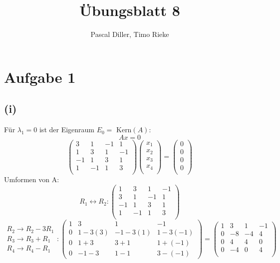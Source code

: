 \documentclass{article}
\title{Übungsblatt 8}
\author{Pascal Diller, Timo Rieke}
\begin{document}
\maketitle

\section*{Aufgabe 1}
\subsection*{(i)}
Für $\lambda_1 = 0$ ist der Eigenraum $E_0 =$ Kern$(A)$:
\[Ax = 0\]
\[\begin{pmatrix}
    3 & 1 & -1 & 1 \\
    1 & 3 & 1 & -1 \\
    -1 & 1 & 3 & 1 \\
    1 & -1 & 1 & 3 \\
\end{pmatrix} \begin{pmatrix}
    x_1 \\
    x_2 \\
    x_3 \\
    x_4 \\
\end{pmatrix} = \begin{pmatrix}
    0 \\
    0 \\
    0 \\
    0 \\
\end{pmatrix}\]
Umformen von A:
\[R_1 \leftrightarrow R_2: \begin{pmatrix}
    1 & 3 & 1 & -1 \\
    3 & 1 & -1 & 1 \\
    -1 & 1 & 3 & 1 \\
    1 & -1 & 1 & 3 \\
\end{pmatrix}\]
\[\begin{matrix}
    R_2 \to R_2 - 3R_1 \\
    R_3 \to R_3 + R_1 \\
    R_4 \to R_4 - R_1 
\end{matrix}: \begin{pmatrix}
    1 & 3 & 1 & -1 \\
    0 & 1-3(3) & -1-3(1) & 1-3(-1) \\
    0 & 1+3 & 3+1 & 1+(-1) \\
    0 & -1-3 & 1-1 & 3-(-1)
\end{pmatrix} = \begin{pmatrix}
    1 & 3 & 1 & -1 \\
    0 & -8 & -4 & 4 \\
    0 & 4 & 4 & 0 \\
    0 & -4 & 0 & 4 \\
\end{pmatrix}\]
\end{document}
